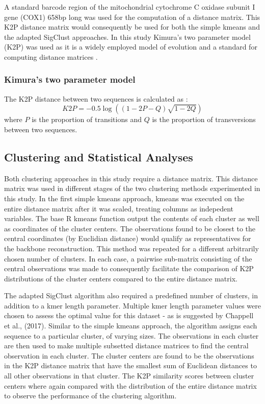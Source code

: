 \documentclass[12pt]{article}
\begin{document}
  A standard barcode region of the mitochondrial cytochrome C oxidase subunit I gene (COX1) 658bp long \cite{Pent2016} was used for the computation of a distance matrix. This K2P distance matrix would consequently be used for both the simple kmeans and the adapted SigClust approaches. In this study Kimura’s two parameter model (K2P) was used as it is a widely employed model of evolution and a standard for computing distance matrices \cite{Collins}.

  \subsubsection{Kimura's two parameter model}
  The K2P distance between two sequences is calculated as \cite{Kimura1980}:
  \begin{equation}
    K2P = -0.5 \log((1-2P-Q)\sqrt{1-2Q})
  \end{equation}
  where $P$ is the proportion of transitions and $Q$ is the proportion of transversions between two sequences.
  
    \subsection{Clustering and Statistical Analyses}

  Both clustering approaches in this study require a distance matrix. This distance matrix was used in different stages of the two clustering methods experimented in this study. In the first simple kmeans approach, kmeans was executed on the entire distance matrix after it was scaled, treating columns as indepedent variables. The base R kmeans function output the contents of each cluster as well as coordinates of the cluster centers. The observations found to be closest to the central coordinates (by Euclidian distance) would qualify as representatives for the backbone reconstruction. This method was repeated for a different arbitrarily chosen number of clusters. In each case, a pairwise sub-matrix consisting of the central observations was made to consequently facilitate the comparison of K2P distributions of the cluster centers compared to the entire distance matrix.

  The adapted SigClust algorithm also required a predefined number of clusters, in addition to a kmer length parameter. Multiple kmer length parameter values were chosen to assess the optimal value for this dataset - as is suggested by Chappell et al., (2017). Similar to the simple kmeans approach, the algorithm assigns each sequence to a particular cluster, of varying sizes. The observations in each cluster are then used to make multiple subsetted distance matrices to find the central observation in each cluster. The cluster centers are found to be the observations in the K2P distance matrix that have the smallest sum of Euclidean distances to all other observations in that cluster. The K2P similarity scores between cluster centers where again compared with the distribution of the entire distance matrix to observe the performance of the clustering algorithm. 
\end{document}
